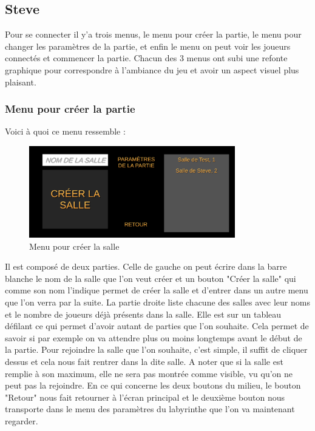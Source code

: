\documentclass{article}
\begin{document}
\subsection{Steve}
\newpage
Pour se connecter il y'a trois menus, le menu pour créer la partie, le menu pour changer les paramètres de la partie, et enfin le menu on peut voir les joueurs connectés et commencer la partie. Chacun des 3 menus ont subi une refonte graphique pour correspondre à l'ambiance du jeu et avoir un aspect visuel plus plaisant.

\subsubsection{Menu pour créer la partie}

Voici à quoi ce menu ressemble : 

\begin{figure}[!ht]
    \centering
    \includegraphics[width=0.8\textwidth]{Menu1.png}
    \caption{Menu pour créer la salle}
    \label{Menu pour créer la salle}
\end{figure}

Il est composé de deux parties. Celle de gauche on peut écrire dans la barre blanche le nom de la salle que l'on veut créer et un bouton "Créer la salle" qui comme son nom l'indique permet de créer la salle et d'entrer dans un autre menu que l'on verra par la suite. La partie droite liste chacune des salles avec leur noms et le nombre de joueurs déjà présents dans la salle. Elle est sur un tableau défilant ce qui permet d'avoir autant de parties que l'on souhaite. Cela permet de savoir si par exemple on va attendre plus ou moins longtemps avant le début de la partie. Pour rejoindre la salle que l'on souhaite, c'est simple, il suffit de cliquer dessus et cela nous fait rentrer dans la dite salle. A noter que si la salle est remplie à son maximum, elle ne sera pas montrée comme visible, vu qu'on ne peut pas la rejoindre. En ce qui concerne les deux boutons du milieu, le bouton "Retour" nous fait retourner à l'écran principal et le deuxième bouton nous transporte dans le menu des paramètres du labyrinthe que l'on va maintenant regarder.
\end{document}
